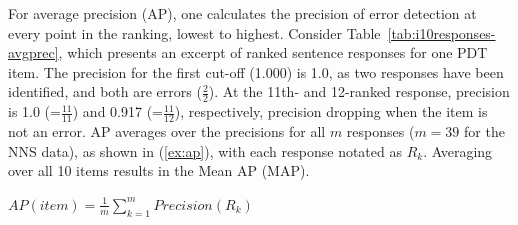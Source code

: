 For average precision (AP), one calculates the precision of error
detection at every point in the ranking, lowest to highest. Consider
Table~\ref{tab:i10responses-avgprec}, which presents an excerpt of ranked sentence
responses for one PDT item. The precision for
the first cut-off (1.000) is 1.0, as two responses have been
identified, and both are errors ($\frac{2}{2}$). At the 11th- and
12-ranked response, precision is 1.0 (=$\frac{11}{11}$) and 0.917
(=$\frac{11}{12}$), respectively, precision dropping when the item is
not an error.
AP averages over the precisions for all $m$ responses ($m=39$ for the
NNS data), as shown in (\ref{ex:ap}), with each response notated as
$R_k$.  Averaging over all 10 items results in the Mean AP (MAP).

%
%

\begin{exe}
\ex\label{ex:ap} $AP(item) = \frac{1}{m} \sum\limits_{k=1}^m
Precision(R_k)$
\end{exe}


